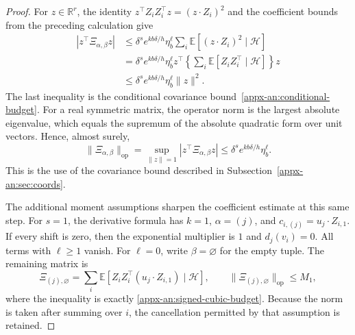 \documentclass[11pt,letterpaper]{article}
\theoremstyle{remark}
\newcommand{\E}{\mathbb E}
\newcommand{\R}{\mathbb R}
\newcommand{\op}{\mathrm{op}}
\begin{document}
\begin{proof}
For $z\in\R^r$, the identity
$z^\top Z_iZ_i^\top z=(z\cdot Z_i)^2$ and the coefficient bounds
from the preceding calculation give
\[
 \begin{aligned}
 |z^\top\Xi_{\alpha,\beta}z|
 &\le\delta^s e^{kb\delta/h}\eta_b^\ell
       \sum_i\E[(z\cdot Z_i)^2\mid\mathcal H]\\
 &=\delta^s e^{kb\delta/h}\eta_b^\ell
       z^\top\left\{\sum_i\E[Z_iZ_i^\top\mid\mathcal H]\right\}z\\
 &\le\delta^s e^{kb\delta/h}\eta_b^\ell\|z\|^2.
 \end{aligned}
\]
The last inequality is the conditional covariance
bound~\eqref{appx-an:conditional-budget}. For a real symmetric
matrix, the operator norm is the largest absolute eigenvalue,
which equals the supremum of the absolute quadratic form over
unit vectors. Hence, almost surely,
\[
 \|\Xi_{\alpha,\beta}\|_{\op}
 =\sup_{\|z\|=1}|z^\top\Xi_{\alpha,\beta}z|
 \le\delta^s e^{kb\delta/h}\eta_b^\ell.
\]
This is the use of the covariance bound described in
Subsection~\ref{appx-an:sec:coords}.

The additional moment assumptions sharpen the coefficient
estimate at this same step. For $s=1$, the derivative formula
has $k=1$, $\alpha=(j)$, and
$c_{i,(j)}=u_j\cdot Z_{i,1}$. If every shift is zero, then the
exponential multiplier is $1$ and $d_j(v_i)=0$. All terms with
$\ell\ge1$ vanish. For $\ell=0$, write $\beta=\varnothing$ for
the empty tuple. The remaining matrix is
\[
 \Xi_{(j),\varnothing}
 =\sum_i\E[Z_iZ_i^\top(u_j\cdot Z_{i,1})\mid\mathcal H],
 \qquad
 \|\Xi_{(j),\varnothing}\|_{\op}\le M_1,
\]
where the inequality is exactly
\eqref{appx-an:signed-cubic-budget}. Because the norm is taken
after summing over $i$, the cancellation permitted by that
assumption is retained.


\end{proof}
\end{document}
